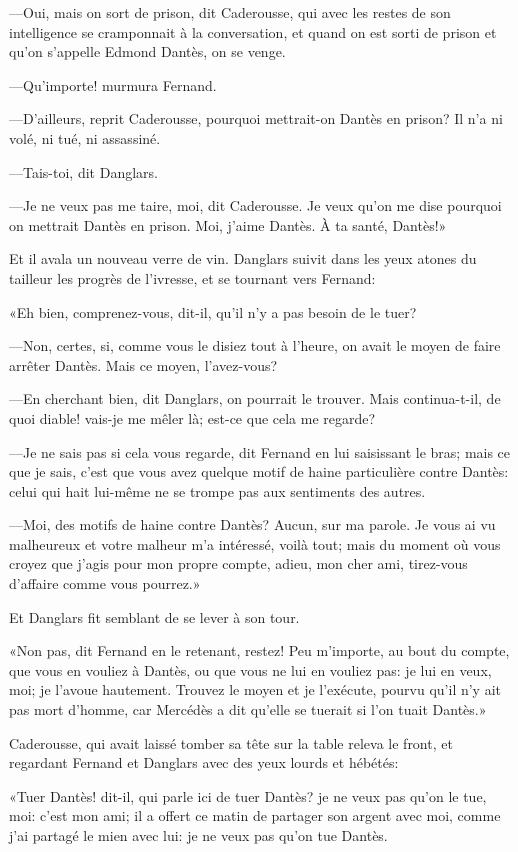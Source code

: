 —Oui, mais on sort de prison, dit Caderousse, qui avec les restes de son intelligence se cramponnait à la conversation, et quand on est sorti de prison et qu'on s'appelle Edmond Dantès, on se venge.

—Qu'importe! murmura Fernand.

—D'ailleurs, reprit Caderousse, pourquoi mettrait-on Dantès en prison? Il n'a ni volé, ni tué, ni assassiné.

—Tais-toi, dit Danglars.

—Je ne veux pas me taire, moi, dit Caderousse. Je veux qu'on me dise pourquoi on mettrait Dantès en prison. Moi, j'aime Dantès. À ta santé, Dantès!»

Et il avala un nouveau verre de vin. Danglars suivit dans les yeux atones du tailleur les progrès de l'ivresse, et se tournant vers Fernand:

«Eh bien, comprenez-vous, dit-il, qu'il n'y a pas besoin de le tuer?

—Non, certes, si, comme vous le disiez tout à l'heure, on avait le moyen de faire arrêter Dantès. Mais ce moyen, l'avez-vous?

—En cherchant bien, dit Danglars, on pourrait le trouver. Mais continua-t-il, de quoi diable! vais-je me mêler là; est-ce que cela me regarde?

—Je ne sais pas si cela vous regarde, dit Fernand en lui saisissant le bras; mais ce que je sais, c'est que vous avez quelque motif de haine particulière contre Dantès: celui qui hait lui-même ne se trompe pas aux sentiments des autres.

—Moi, des motifs de haine contre Dantès? Aucun, sur ma parole. Je vous ai vu malheureux et votre malheur m'a intéressé, voilà tout; mais du moment où vous croyez que j'agis pour mon propre compte, adieu, mon cher ami, tirez-vous d'affaire comme vous pourrez.»

Et Danglars fit semblant de se lever à son tour.

«Non pas, dit Fernand en le retenant, restez! Peu m'importe, au bout du compte, que vous en vouliez à Dantès, ou que vous ne lui en vouliez pas: je lui en veux, moi; je l'avoue hautement. Trouvez le moyen et je l'exécute, pourvu qu'il n'y ait pas mort d'homme, car Mercédès a dit qu'elle se tuerait si l'on tuait Dantès.»

Caderousse, qui avait laissé tomber sa tête sur la table releva le front, et regardant Fernand et Danglars avec des yeux lourds et hébétés:

«Tuer Dantès! dit-il, qui parle ici de tuer Dantès? je ne veux pas qu'on le tue, moi: c'est mon ami; il a offert ce matin de partager son argent avec moi, comme j'ai partagé le mien avec lui: je ne veux pas qu'on tue Dantès.

